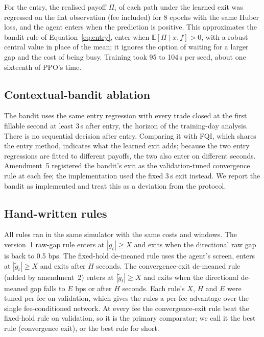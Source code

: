 \documentclass[12pt,a4paper]{article}
\DeclareRobustCommand{\bps}{\ifmmode\,\text{bps}\else\,bps\fi}
\newcommand{\gt}{\tilde g}
\newcommand{\E}{\mathbb{E}}
\begin{document}
For the entry, the realised payoff $\Pi_i$ of each path under the learned exit was regressed on
the flat observation (fee included) for 8 epochs with the same Huber loss, and the agent enters
when the prediction is positive. This approximates the bandit rule of
Equation~\eqref{eq:entry}, enter when $\E[\Pi\mid x,f]>0$, with a robust central value in place
of the mean; it ignores the option of waiting for a larger gap and the cost of being busy.
Training took 95 to 104\,s per seed, about one sixteenth of PPO's time.

\subsection{Contextual-bandit ablation}
The bandit uses the same entry regression with every trade closed at the first fillable
second at least 3\,s after entry, the horizon of the training-day analysis. There is no
sequential decision after entry. Comparing it with FQI, which shares the entry method,
indicates what the learned exit adds; because the two entry regressions are fitted to
different payoffs, the two also enter on different seconds. Amendment~5 registered the
bandit's exit as the validation-tuned convergence rule at each fee; the implementation used the fixed 3\,s exit
instead. We report the bandit as implemented and treat this as a deviation from the protocol.

\subsection{Hand-written rules}
All rules ran in the same simulator with the same costs and windows. The version~1 raw-gap
rule enters at $|g_t|\geq X$ and exits when the directional raw gap is back to 0.5\bps. The
fixed-hold de-meaned rule uses the agent's screen, enters at $|\gt_t|\geq X$ and exits after
$H$ seconds. The convergence-exit de-meaned rule (added by amendment~2) enters at
$|\gt_t|\geq X$ and exits when the directional de-meaned gap falls to $E$\bps{} or after $H$
seconds. Each rule's $X$, $H$ and $E$ were tuned per fee on validation, which gives the rules
a per-fee advantage over the single fee-conditioned network. At every fee the
convergence-exit rule beat the fixed-hold rule on validation, so it is the primary
comparator; we call it the best rule (convergence exit), or the best rule for short.
\end{document}
